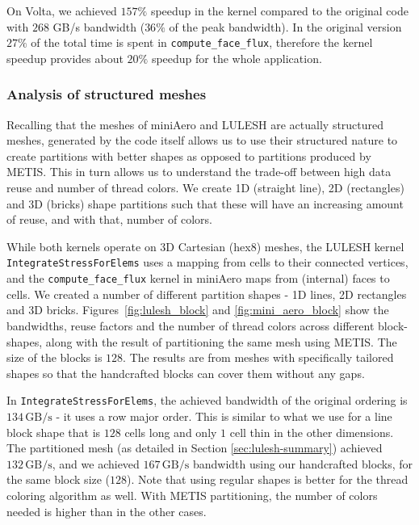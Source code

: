 On Volta, we achieved $157\%$ speedup in the kernel compared to the
original code with $268$ GB/s bandwidth ($36\%$ of the peak bandwidth). In the
original version $27\%$ of the total time is spent 
in \texttt{compute\_face\_flux}, therefore the kernel speedup provides about
$20\%$ speedup for the whole application.




\subsubsection{Analysis of structured meshes}

\noindent Recalling that the meshes of miniAero and LULESH are actually 
structured meshes, generated by the code itself allows us to use their 
structured nature to create partitions with better shapes as opposed to 
partitions produced by METIS. This in turn allows us to understand the trade-off 
between high data reuse and number of thread colors.  We create 1D (straight 
line), 2D (rectangles) and 3D (bricks) shape partitions such that these will 
have an increasing amount of reuse, and with that, number  of colors. 

While both kernels operate on 3D Cartesian (hex8) meshes, the LULESH kernel 
\texttt{IntegrateStressForElems} uses a mapping from cells to their connected 
vertices, and the \texttt{compute\_face\_flux} kernel in miniAero maps from 
(internal) faces to cells. We created a number of different partition shapes - 
1D lines, 2D rectangles and 3D bricks. Figures~\ref{fig:lulesh_block} and 
\ref{fig:mini_aero_block} show the bandwidths, reuse factors and the number of 
thread colors across different block-shapes, along with the result of 
partitioning the same mesh using METIS. The size of the blocks is $128$. The 
results are from meshes with specifically tailored shapes so that the 
handcrafted blocks can cover them without any gaps. 

In \texttt{IntegrateStressForElems}, the achieved bandwidth of the 
original ordering is $134\,\text{GB/s}$ - it uses a row major order. This is 
similar to what we use for a line block shape that is $128$ cells long and only $1$ 
cell thin in the other dimensions. The partitioned mesh (as detailed in Section 
\ref{sec:lulesh-summary}) achieved $132\,\text{GB/s}$, and we achieved 
$167\,\text{GB/s}$ bandwidth using our handcrafted blocks, for the same block 
size ($128$). Note that using regular shapes is better for the thread coloring 
algorithm as well. With METIS partitioning, the number of colors needed 
is higher than in the other cases.

